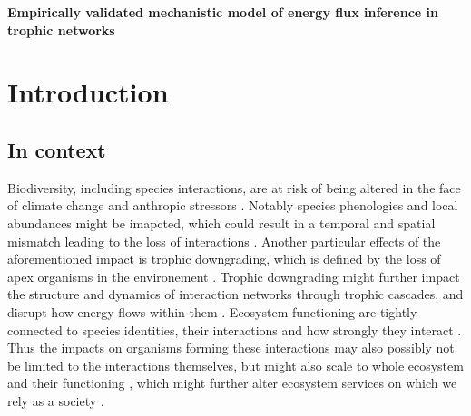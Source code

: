 \documentclass[english,12pt]{article}
\begin{document}


\tableofcontents
\newpage

\begin{center}
\Large{\textbf{Empirically validated mechanistic model of energy flux inference in trophic networks}}
\end{center}

\section{Introduction}
\subsection{In context}
Biodiversity, including species interactions, are at risk of being altered in the face of climate change and anthropic stressors \citep{Estes2011TroDow,Purves2013TimMod,Woodward2010CliCha}. Notably species phenologies and local abundances might be imapcted, which could result in a temporal and spatial mismatch leading to the loss of interactions \citep{Montoya2010CliCha,Parmesan2003GloCoh,Schweiger2008CliCha,Renner2018CliCha,Miller-Rushing2010EffPhe,Visser2005ShiPhe}. Another particular effects of the aforementioned impact is trophic downgrading, which is defined by the loss of apex organisms in the environement \citep{Estes2011TroDow}. Trophic downgrading might further impact the structure and dynamics of interaction networks through trophic cascades, and disrupt how energy flows within them \citep{Estes2011TroDow,Duffy2002BioEco}. Ecosystem functioning are tightly connected to species identities, their interactions and how strongly they interact \citep{Duffy2002BioEco}. Thus the impacts on organisms forming these interactions may also possibly not be limited to the interactions themselves, but might also scale to whole ecosystem and their functioning \citep{Woodward2010CliCha,Traill2010RevMec}, which might further alter ecosystem services on which we rely as a society \citep{Dobson2006HabLos,Montoya2010CliCha}.
\end{document}
